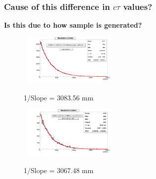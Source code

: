 \documentclass{beamer}
\begin{document}
\begin{frame}
\frametitle{Cause of this difference in $c\tau$ values?}
\begin{LARGE}  
  \textbf{Is this due to how sample is generated?}
    \end{LARGE}
    \vspace{-0.3cm}
 \begin{figure}[ht]
    \begin{minipage}[b]{0.45\linewidth}
    \centering
    \mbox{
    \includegraphics[height=2.5cm, width=\textwidth]{MC_TimeDL.png}}
     \vspace{-1cm}
    \caption{1/Slope = 3083.56 mm }
    \label{fig:OffFrom_MC}
    \end{minipage}
    \hspace{0.1cm}
    \begin{minipage}[b]{0.45\linewidth}
    \centering
    \mbox{
    \includegraphics[height=2.5cm,width=\textwidth]{Priv_MC_TimeDL.png}}
    \vspace{-1cm}
     \caption{1/Slope = 3067.48 mm }
     \label{fig:Priv_MCTime}
     \end{minipage}
\end{figure}

\vspace{-1.0cm}


\end{frame}
\end{document}

